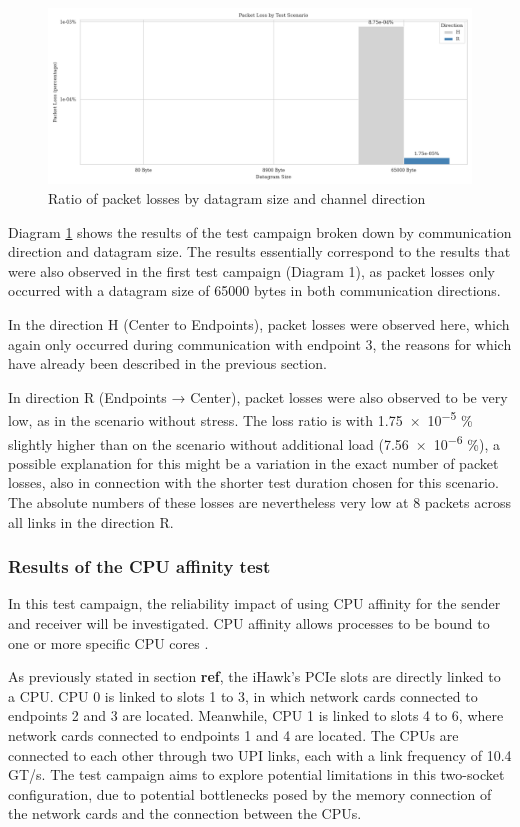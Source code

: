 \documentclass[11pt]{article}
\begin{document}
\begin{figure}[h]
	\includegraphics[width=\textwidth]{fig7.png}
	\centering
	\caption{Ratio of packet losses by datagram size and channel direction}
    \label{fig:fig7}
\end{figure}

Diagram \ref{fig:fig7} shows the results of the test campaign broken down by communication direction and datagram size. The results essentially correspond to the results that were also observed in the first test campaign (Diagram 1), as packet losses only occurred with a datagram size of 65000 bytes in both communication directions.

In the direction H (Center to Endpoints), packet losses were observed here, which again only occurred during communication with endpoint 3, the reasons for which have already been described in the previous section.

In direction R (Endpoints → Center), packet losses were also observed to be very low, as in the scenario without stress. The loss ratio is with \num{1.75e-5} \% slightly higher than on the scenario without additional load (\num{7.56e-6} \%), a possible explanation for this might be a variation in the exact number of packet losses, also in connection with the shorter test duration chosen for this scenario. The absolute numbers of these losses are nevertheless very low at 8 packets across all links in the direction R.


\subsubsection{Results of the CPU affinity test}
In this test campaign, the reliability impact of using CPU affinity for the sender and receiver will be investigated. CPU affinity allows processes to be bound to one or more specific CPU cores \cite{tbd}.

As previously stated in section \textbf{ref}, the iHawk's PCIe slots are directly linked to a CPU. CPU 0 is linked to slots 1 to 3, in which network cards connected to endpoints 2 and 3 are located. Meanwhile, CPU 1 is linked to slots 4 to 6, where network cards connected to endpoints 1 and 4 are located. The CPUs are connected to each other through two UPI links, each with a link frequency of 10.4 GT/s. The test campaign aims to explore potential limitations in this two-socket configuration, due to potential bottlenecks posed by the memory connection of the network cards and the connection between the CPUs.
\end{document}
